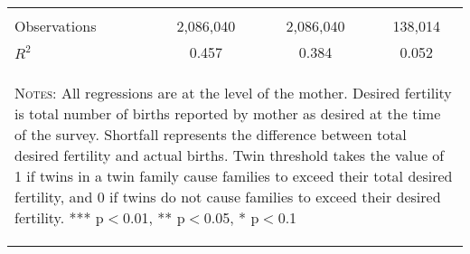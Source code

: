 \begin{table}[htpb!]
\begin{tabular}{lccc}
\vspace{4pt} & \begin{footnotesize}\end{footnotesize} & \begin{footnotesize}\end{footnotesize} \\
Observations & 2,086,040 & 2,086,040 & 138,014 \\
 $R^2$ & 0.457 & 0.384 & 0.052 \\ \hline
\multicolumn{4}{p{11.2cm}}{\begin{footnotesize} \textsc{Notes:}  All regressions are at the level of the mother.  Desired fertility is total number 
of births reported by mother as desired at the time of the survey.  Shortfall represents the difference between total desired fertility and actual 
births.  Twin threshold takes the value of 1 if twins in a twin family cause families to exceed their total desired fertility, and 0 if twins do 
not cause families to exceed their desired fertility. *** p$<$0.01, ** p$<$0.05, * p$<$0.1\end{footnotesize}} \\ \hline
\end{tabular}
\end{table}
\newpage
